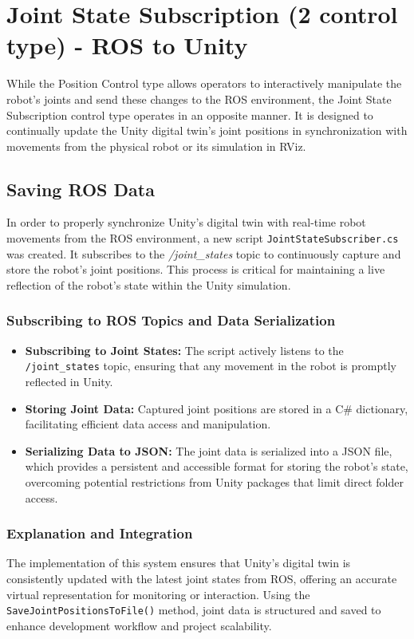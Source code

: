     \section{Joint State Subscription (2 control type) - ROS to Unity}

    While the Position Control type allows operators to interactively manipulate the robot's joints and send these changes to the ROS environment, the Joint State Subscription control type operates in an opposite manner. It is designed to continually update the Unity digital twin's joint positions in synchronization with movements from the physical robot or its simulation in RViz. 


    \subsection{Saving ROS Data}
    In order to properly synchronize Unity's digital twin with real-time robot movements from the ROS environment, a new script \texttt{JointStateSubscriber.cs} was created. It subscribes to the \textit{/joint\_states} topic to continuously capture and store the robot's joint positions. This process is critical for maintaining a live reflection of the robot's state within the Unity simulation.
    
    \subsubsection{Subscribing to ROS Topics and Data Serialization}
    \begin{itemize}
        \item \textbf{Subscribing to Joint States:} The script actively listens to the \texttt{/joint\_states} topic, ensuring that any movement in the robot is promptly reflected in Unity.
        \item \textbf{Storing Joint Data:} Captured joint positions are stored in a C\# dictionary, facilitating efficient data access and manipulation.
        \item \textbf{Serializing Data to JSON:} The joint data is serialized into a JSON file, which provides a persistent and accessible format for storing the robot's state, overcoming potential restrictions from Unity packages that limit direct folder access.
    \end{itemize}
    
    \subsubsection{Explanation and Integration}
    The implementation of this system ensures that Unity's digital twin is consistently updated with the latest joint states from ROS, offering an accurate virtual representation for monitoring or interaction. Using the \texttt{SaveJointPositionsToFile()} method, joint data is structured and saved to enhance development workflow and project scalability.
    

